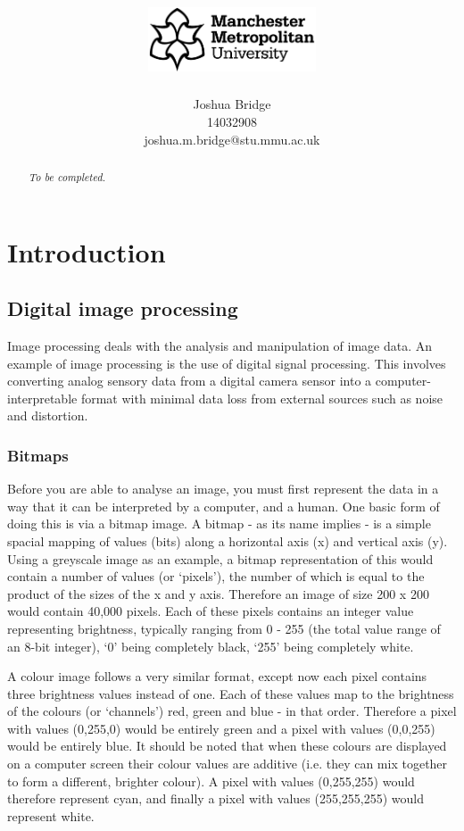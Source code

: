 \documentclass[a4paper,12pt]{report}
\title{\vspace{-2cm}\includegraphics[width=5cm]{mmu-white.pdf}\\\vspace{4cm}\reportTitle\vspace{1cm}}
\author{Joshua Bridge\\14032908\\joshua.m.bridge@stu.mmu.ac.uk}
\begin{document}
\maketitle

\doublespacing

\begin{abstract}
  \textit{To be completed.}
\end{abstract}

\tableofcontents

\listoffigures

\listoftables

\chapter{Introduction}

  \section{Digital image processing}
   Image processing deals with the analysis and manipulation of image data. An example of image processing is the use of digital signal processing. This involves converting analog sensory data from a digital camera sensor into a computer-interpretable format with minimal data loss from external sources such as noise and distortion.\\

   \subsection{Bitmaps}
     Before you are able to analyse an image, you must first represent the data in a way that it can be interpreted by a computer, and a human. One basic form of doing this is via a bitmap image. A bitmap - as its name implies - is a simple spacial mapping of values (bits) along a horizontal axis (x) and vertical axis (y). Using a greyscale image as an example, a bitmap representation of this would contain a number of values (or ‘pixels’), the number of which is equal to the product of the sizes of the x and y axis. Therefore an image of size 200 x 200 would contain 40,000 pixels. Each of these pixels contains an integer value representing brightness, typically ranging from 0 - 255 (the total value range of an 8-bit integer), ‘0’ being completely black, ‘255’ being completely white.

     A colour image follows a very similar format, except now each pixel contains three brightness values instead of one. Each of these values map to the brightness of the colours (or ‘channels’) red, green and blue - in that order. Therefore a pixel with values (0,255,0) would be entirely green and a pixel with values (0,0,255) would be entirely blue. It should be noted that when these colours are displayed on a computer screen their colour values are additive (i.e. they can mix together to form a different, brighter colour). A pixel with values (0,255,255) would therefore represent cyan, and finally a pixel with values (255,255,255) would represent white.
\end{document}
